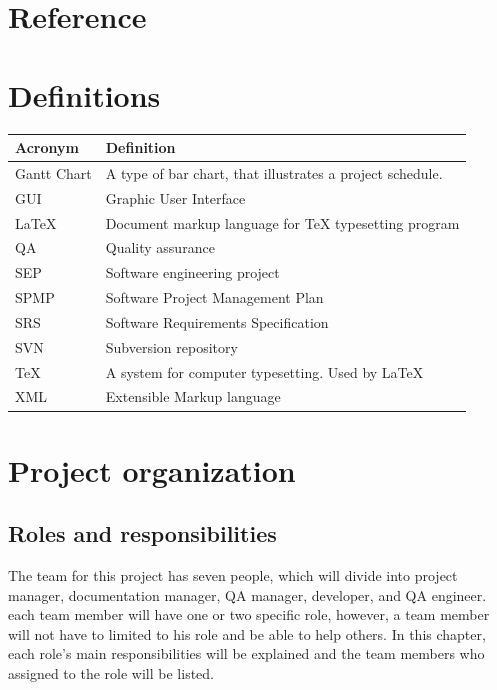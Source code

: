 \documentclass[11pt, a4paper]{report}
\begin{document}
\pagebreak


\chapter{Reference}

\pagebreak


\chapter{Definitions}
\begin{tabular}{| l | l | }
\hline
Acronym      		&	Definition       											\\ \hline
Gantt Chart      	& 	A type of bar chart, that illustrates a project schedule.	\\ \hline
GUI					& 	Graphic User Interface 										\\ \hline
{\LaTeX}			&	Document markup language for {\TeX} typesetting program 	\\ \hline
QA 					&	Quality assurance 											\\ \hline
SEP					&	Software engineering project								\\ \hline
SPMP				&	Software Project Management Plan							\\ \hline
SRS					&	Software Requirements Specification							\\ \hline
SVN					&	Subversion repository										\\ \hline
{\TeX} 				&	A system for computer typesetting. Used by {\LaTeX}			\\ \hline
XML					& 	Extensible Markup language 									\\ \hline
\end{tabular}

\pagebreak


\chapter{Project organization}

\section{Roles and responsibilities}
The team for this project has seven people, which will divide into project manager, documentation manager, QA manager, developer, and QA engineer. each team member will have one or two specific role, however, a team member will not have to limited to his role and be able to help others. In this chapter, each role's main responsibilities will be explained and the team members who assigned to the role will be listed.
\end{document}
